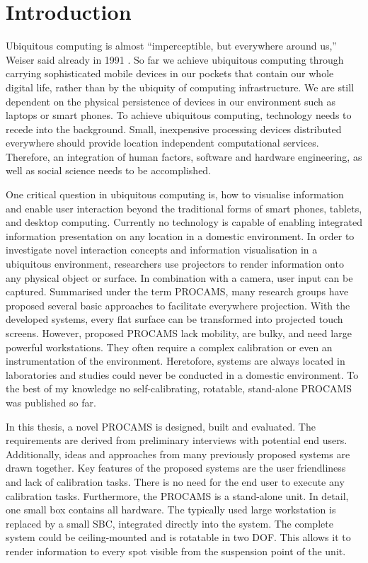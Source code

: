 
\chapter{Introduction}
Ubiquitous computing is almost ``imperceptible, but everywhere around us,'' Weiser said already in 1991 \cite{Weiser:1991fa}. So far we achieve ubiquitous computing through carrying sophisticated mobile devices in our pockets that contain our whole digital life, rather than by the ubiquity of computing infrastructure. We are still dependent on the physical persistence of devices in our environment such as laptops or smart phones. To achieve ubiquitous computing, technology needs to recede into the background. Small, inexpensive processing devices distributed everywhere should provide location independent computational services. Therefore, an integration of human factors, software and hardware engineering, as well as social science needs to be accomplished.

One critical question in ubiquitous computing is, how to visualise information and enable user interaction beyond the traditional forms of smart phones, tablets, and desktop computing.
Currently no technology is capable of enabling integrated information presentation on any location in a domestic environment. In order to investigate novel interaction concepts and information visualisation in a ubiquitous environment, researchers use projectors to render information onto any physical object or surface. In combination with a camera, user input can be captured. Summarised under the term \ac{PROCAMS}, many research groups have proposed several basic approaches to facilitate everywhere projection. With the developed systems, every flat surface can be transformed into projected touch screens. However, proposed PROCAMS lack mobility, are bulky, and need large powerful workstations. They often require a complex calibration or even an instrumentation of the environment. Heretofore, systems are always located in laboratories and studies could never be conducted in a domestic environment. To the best of my knowledge no self-calibrating, rotatable, stand-alone PROCAMS was published so far.

In this thesis, a novel \ac{PROCAMS} is designed, built and evaluated. The requirements are derived from preliminary interviews with potential end users. Additionally, ideas and approaches from many previously proposed systems are drawn together. Key features of the proposed systems are the user friendliness and lack of calibration tasks. There is no need for the end user to execute any calibration tasks. Furthermore, the PROCAMS is a stand-alone unit. In detail, one small box contains all hardware. The typically used large workstation is replaced by a small \ac{SBC}, integrated directly into the system. The complete system could be ceiling-mounted and is rotatable in two \ac{DOF}. This allows it to render information to every spot visible from the suspension point of the unit.

